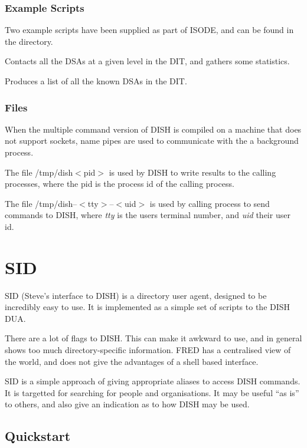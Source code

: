 \subsection{Example Scripts}
Two example scripts have been supplied as part of ISODE, and can be found in
the  directory.
\begin{describe}
\item [\verb+dsaping+:] Contacts all the DSAs at a given level in the DIT, and
gathers some statistics.
\item [\verb+dsalist+:] Produces a list of all the known DSAs in the DIT.
\end{describe}

\subsection {Files}


When the multiple command version of DISH is compiled on a machine that does
not support sockets, name pipes are used 
to communicate with the
a background process.

The file /tmp/dish$<$pid$>$ is used by DISH to write results to the calling
processes, where the pid is the process id of the calling process.

The file /tmp/dish--$<$tty$>$--$<$uid$>$ is used by calling process to send commands to
DISH, where {\em tty} is the users terminal number, and {\em uid} their user id.


\chapter {SID}
\label{DUA:sid}
SID (Steve's interface to DISH) is a directory user agent, designed to be
incredibly easy to use.
It is implemented as a simple set of scripts to the DISH DUA.

There are a lot of flags to DISH. This can make it awkward to use, and in
general shows too much directory-specific information.
FRED has a centralised view of the world, and does not give
the advantages of a shell based interface.

SID is a simple approach of giving appropriate aliases to access DISH
commands.   It is targetted for searching for people and organisations.
It may be useful ``as is'' to others, and also give an indication as to how
DISH may be used.


\section {Quickstart}


